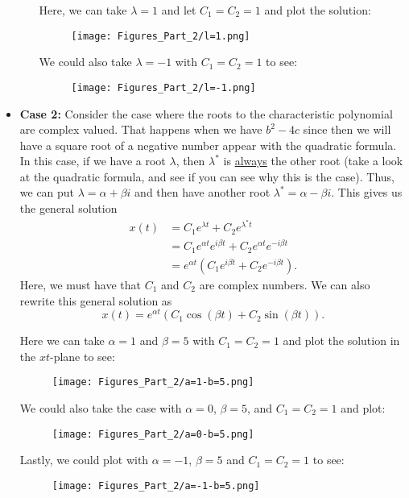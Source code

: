 \begin{itemize}
\begin{itemize}
                Here, we can take $\lambda=1$ and let $C_1=C_2=1$ and plot the solution:
                \begin{figure}[H]
                    \centering
                    \texttt{[image: Figures\_Part\_2/l=1.png]}
                \end{figure}
                We could also take $\lambda=-1$ with $C_1=C_2=1$ to see:
                \begin{figure}[H]
                    \centering
                    \texttt{[image: Figures\_Part\_2/l=-1.png]}
                \end{figure}
            \end{itemize}
            \item \textbf{Case 2:} Consider the case where the roots to the characteristic polynomial are complex valued.  That happens when we have $b^2-4c$ since then we will have a square root of a negative number appear with the quadratic formula. In this case, if we have a root $\lambda$, then $\lambda^*$ is \underline{always} the other root (take a look at the quadratic formula, and see if you can see why this is the case).  Thus, we can put $\lambda=\alpha+\beta i$ and then have another root $\lambda^*=\alpha-\beta i$. This gives us the general solution
            \begin{align*}
                x(t)&= C_1 e^{\lambda t}+C_2 e^{\lambda^* t}\\
                &= C_1 e^{\alpha t}e^{i\beta t}+C_2e^{\alpha t}e^{-i\beta t}\\
                &= e^{\alpha t}\left( C_1 e^{i\beta t}+C_2 e^{-i\beta t}\right).
            \end{align*}
            Here, we must have that $C_1$ and $C_2$ are complex numbers.  We can also rewrite this general solution as
            \[
            x(t)= e^{\alpha t}(C_1 \cos(\beta t)+C_2\sin(\beta t)).
            \]

            Here we can take $\alpha = 1$ and $\beta =5$ with $C_1=C_2=1$ and plot the solution in the $xt$-plane to see:
            \begin{figure}[H]
                \centering
                \texttt{[image: Figures\_Part\_2/a=1-b=5.png]}
            \end{figure}
            We could also take the case with $\alpha=0$, $\beta=5$, and $C_1=C_2=1$ and plot:
            \begin{figure}[H]
                \centering
                \texttt{[image: Figures\_Part\_2/a=0-b=5.png]}
            \end{figure}
            Lastly, we could plot with $\alpha=-1$, $\beta =5$ and $C_1=C_2=1$ to see:
                        \begin{figure}[H]
                \centering
                \texttt{[image: Figures\_Part\_2/a=-1-b=5.png]}
            \end{figure}
        \end{itemize}

